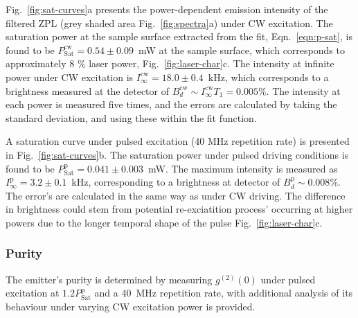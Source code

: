 Fig.~\ref{fig:sat-curves}a presents the power-dependent emission intensity of the filtered ZPL (grey shaded area Fig.~\ref{fig:spectra}a) under CW excitation. The saturation power at the sample surface extracted from the fit, Eqn.~\ref{eqn:p-sat}, is found to be $P_{\text{Sat}}^{\text{cw}} = 0.54 \pm 0.09$~mW at the sample surface, which corresponds to approximately 8 \% laser power, Fig.~\ref{fig:laser-char}c. The intensity at infinite power under CW excitation is $I_{\infty}^{\text{cw}} = 18.0 \pm 0.4$~kHz, which corresponds to a brightness measured at the detector of $B_d^{\text{cw}} \sim I_{\infty}^{\text{cw}} T_1 = 0.005\%$. The intensity at each power is measured five times, and the errors are calculated by taking the standard deviation, and using these within the fit function.

A saturation curve under pulsed excitation (40 MHz repetition rate) is presented in Fig.~\ref{fig:sat-curves}b. The saturation power under pulsed driving conditions is found to be $P_{\text{Sat}}^{\text{p}} = 0.041 \pm 0.003$~mW. The maximum intensity is measured as $I_{\infty}^{\text{p}} = 3.2 \pm 0.1$~kHz, corresponding to a brightness at detector of $B_d^{\text{p}} \sim 0.008\%$. The error's are calculated in the same way as under CW driving. The difference in brightness could stem from potential re-exciatition process' occurring at higher powers due to the longer temporal shape of the pulse Fig.~\ref{fig:laser-char}c.

\subsubsection{Purity}

The emitter’s purity is determined by measuring $g^{(2)}(0)$ under pulsed excitation at $1.2P^{\text{p}}_{\text{Sat}}$ and a 40~MHz repetition rate, with additional analysis of its behaviour under varying CW excitation power is provided.


